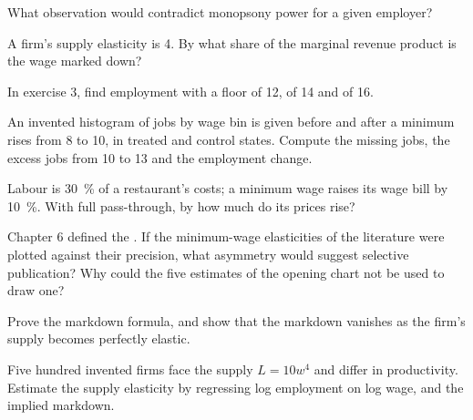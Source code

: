 \begin{exercise}[$\star$]\label{exo:b3:minimum-wage:4}
What observation would contradict monopsony power for a given employer?
\end{exercise}

\begin{exercise}[$\star\star$]\label{exo:b3:minimum-wage:5}
A firm's supply elasticity is 4. By what share of the marginal revenue product is the
wage marked down?
\end{exercise}

\begin{exercise}[$\star\star$]\label{exo:b3:minimum-wage:6}
In exercise 3, find employment with a floor of 12, of 14 and of 16.
\end{exercise}

\begin{exercise}[$\star\star$]\label{exo:b3:minimum-wage:7}
An invented histogram of jobs by wage bin is given before and after a minimum rises
from 8 to 10, in treated and control states. Compute the missing jobs, the excess jobs
from 10 to 13 and the employment change.
\end{exercise}

\begin{exercise}[$\star\star$]\label{exo:b3:minimum-wage:8}
Labour is 30~\% of a restaurant's costs; a minimum wage raises its wage bill by 10~\%. With
full pass-through, by how much do its prices rise?
\end{exercise}

\begin{exercise}[$\star\star$]\label{exo:b3:minimum-wage:9}
Chapter 6 defined the . If the minimum-wage elasticities of the
literature were plotted against their precision, what asymmetry would suggest
selective publication? Why could the five estimates of the opening chart not be
used to draw one?
\end{exercise}

\begin{exercise}[$\star\star\star$]\label{exo:b3:minimum-wage:10}
Prove the markdown formula, and show that the markdown vanishes as the firm's supply
becomes perfectly elastic.
\end{exercise}

\begin{exercise}[$\star\star\star$]\label{exo:b3:minimum-wage:11}
Five hundred invented firms face the supply $L = 10w^4$ and differ in productivity. Estimate
the supply elasticity by regressing log employment on log wage, and the implied
markdown.
\end{exercise}

